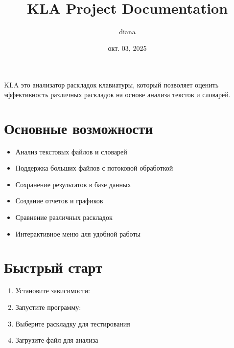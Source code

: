 \documentclass[a4paper,11pt,russian,openany,oneside]{sphinxmanual}
\title{KLA Project Documentation}
\date{окт. 03, 2025}
\author{diana}
\begin{document}
\pagestyle{empty}
\sphinxmaketitle
\pagestyle{plain}

        \renewcommand{\contentsname}{Оглавление}
        \setcounter{tocdepth}{3}
        \tableofcontents
    
\pagestyle{normal}
\label{\detokenize{index::doc}}


\sphinxAtStartPar
KLA \sphinxhyphen{} это анализатор раскладок клавиатуры, который позволяет оценить эффективность различных раскладок на основе анализа текстов и словарей.


\chapter{Основные возможности}
\label{\detokenize{index:id1}}\begin{itemize}
\item {} 
\sphinxAtStartPar
Анализ текстовых файлов и словарей

\item {} 
\sphinxAtStartPar
Поддержка больших файлов с потоковой обработкой

\item {} 
\sphinxAtStartPar
Сохранение результатов в базе данных

\item {} 
\sphinxAtStartPar
Создание отчетов и графиков

\item {} 
\sphinxAtStartPar
Сравнение различных раскладок

\item {} 
\sphinxAtStartPar
Интерактивное меню для удобной работы

\end{itemize}


\chapter{Быстрый старт}
\label{\detokenize{index:id2}}\begin{enumerate}
%
\item {} 
\sphinxAtStartPar
Установите зависимости: 

\item {} 
\sphinxAtStartPar
Запустите программу: 

\item {} 
\sphinxAtStartPar
Выберите раскладку для тестирования

\item {} 
\sphinxAtStartPar
Загрузите файл для анализа

\end{enumerate}
\end{document}
